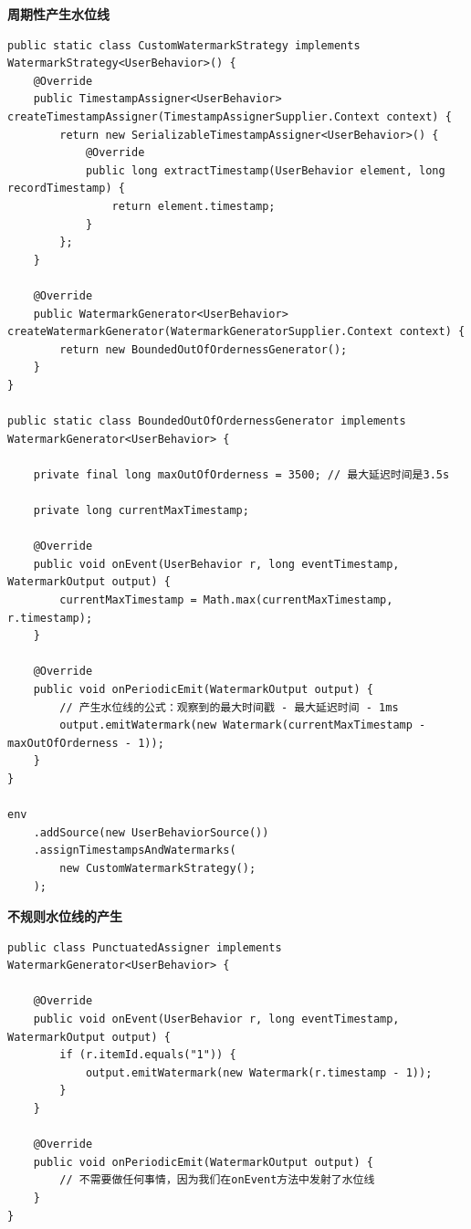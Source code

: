 \documentclass[cn,11pt,chinese]{elegantbook}
\begin{document}
\textbf{周期性产生水位线}

\begin{verbatim}
public static class CustomWatermarkStrategy implements WatermarkStrategy<UserBehavior>() {
    @Override
    public TimestampAssigner<UserBehavior> createTimestampAssigner(TimestampAssignerSupplier.Context context) {
        return new SerializableTimestampAssigner<UserBehavior>() {
            @Override
            public long extractTimestamp(UserBehavior element, long recordTimestamp) {
                return element.timestamp;
            }
        };
    }

    @Override
    public WatermarkGenerator<UserBehavior> createWatermarkGenerator(WatermarkGeneratorSupplier.Context context) {
        return new BoundedOutOfOrdernessGenerator();
    }
}

public static class BoundedOutOfOrdernessGenerator implements WatermarkGenerator<UserBehavior> {
    
    private final long maxOutOfOrderness = 3500; // 最大延迟时间是3.5s
    
    private long currentMaxTimestamp;
    
    @Override
    public void onEvent(UserBehavior r, long eventTimestamp, WatermarkOutput output) {
        currentMaxTimestamp = Math.max(currentMaxTimestamp, r.timestamp);
    }
    
    @Override
    public void onPeriodicEmit(WatermarkOutput output) {
        // 产生水位线的公式：观察到的最大时间戳 - 最大延迟时间 - 1ms
        output.emitWatermark(new Watermark(currentMaxTimestamp - maxOutOfOrderness - 1));
    }
}

env
    .addSource(new UserBehaviorSource())
    .assignTimestampsAndWatermarks(
        new CustomWatermarkStrategy();
    );
\end{verbatim}

\textbf{不规则水位线的产生}

\begin{verbatim}
public class PunctuatedAssigner implements WatermarkGenerator<UserBehavior> {
    
    @Override
    public void onEvent(UserBehavior r, long eventTimestamp, WatermarkOutput output) {
        if (r.itemId.equals("1")) {
            output.emitWatermark(new Watermark(r.timestamp - 1));
        }
    }
    
    @Override
    public void onPeriodicEmit(WatermarkOutput output) {
        // 不需要做任何事情，因为我们在onEvent方法中发射了水位线
    }
}
\end{verbatim}
\end{document}

